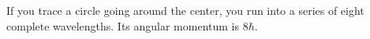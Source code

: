 If you trace a circle going around the center, you run into a series of eight complete
 wavelengths. Its angular momentum is $8\hbar$.
